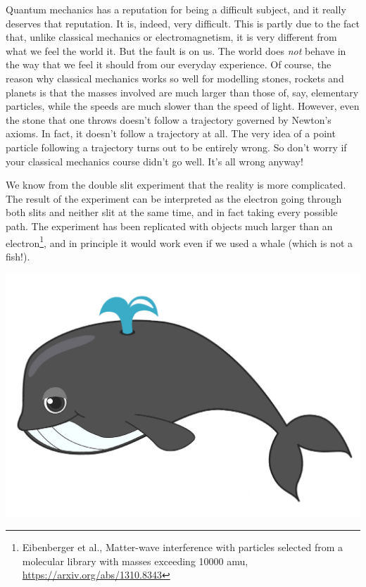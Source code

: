 
Quantum mechanics has a reputation for being a difficult subject, and it really deserves that reputation. It is, indeed, very difficult. This is partly due to the fact that, unlike classical mechanics or electromagnetism, it is very different from what we feel the world it. But the fault is on us. The world does \emph{not} behave in the way that we feel it should from our everyday experience. Of course, the reason why classical mechanics works so well for modelling stones, rockets and planets is that the masses involved are much larger than those of, say, elementary particles, while the speeds are much slower than the speed of light. However, even the stone that one throws doesn't follow a trajectory governed by Newton's axioms. In fact, it doesn't follow a trajectory at all. The very idea of a point particle following a trajectory turns out to be entirely wrong. So don't worry if your classical mechanics course didn't go well. It's all wrong anyway!

We know from the double slit experiment that the reality  is more complicated. The result of the experiment can be interpreted as the electron going through both slits and neither slit at the same time, and in fact taking every possible path. The experiment has been replicated with objects much larger than an electron\footnote{Eibenberger et al., Matter-wave interference with particles selected from a molecular library with masses exceeding 10000 amu, \url{https://arxiv.org/abs/1310.8343}}, and in principle it would work even if we used a whale (which is not a fish!).

\vspace{1cm}
\begin{center}
\includegraphics[scale=0.8]{graphics/clean_whale}
\end{center}




